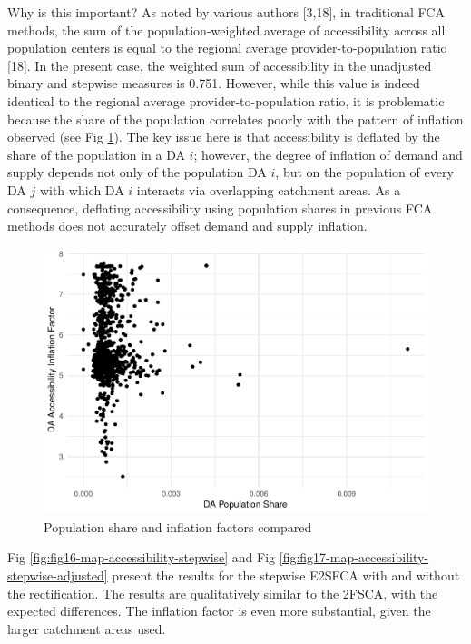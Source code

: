 \documentclass[10pt,letterpaper]{article}
\begin{document}
Why is this important? As noted by various authors {[}3,18{]}, in
traditional FCA methods, the sum of the population-weighted average of
accessibility across all population centers is equal to the regional
average provider-to-population ratio {[}18{]}. In the present case, the
weighted sum of accessibility in the unadjusted binary and stepwise
measures is 0.751. However, while this value is indeed identical to the
regional average provider-to-population ratio, it is problematic because
the share of the population correlates poorly with the pattern of
inflation observed (see Fig
\ref{fig:fig15-map-pop-share-inflation-comparison-binary}). The key
issue here is that accessibility is deflated by the share of the
population in a DA \(i\); however, the degree of inflation of demand and
supply depends not only of the population DA \(i\), but on the
population of every DA \(j\) with which DA \(i\) interacts via
overlapping catchment areas. As a consequence, deflating accessibility
using population shares in previous FCA methods does not accurately
offset demand and supply inflation.

\begin{figure}
\includegraphics[width=0.95\linewidth]{Supply_and_Demand_Inflation_in_FCA_Methods_v2.0_files/figure-latex/fig15-map-pop-share-inflation-comparison-binary-1} \caption{\label{fig:fig15-map-pop-share-inflation-comparison-binary}Population share and inflation factors compared}\label{fig:fig15-map-pop-share-inflation-comparison-binary}
\end{figure}

Fig \ref{fig:fig16-map-accessibility-stepwise} and Fig
\ref{fig:fig17-map-accessibility-stepwise-adjusted} present the results
for the stepwise E2SFCA with and without the rectification. The results
are qualitatively similar to the 2FSCA, with the expected differences.
The inflation factor is even more substantial, given the larger
catchment areas used.
\end{document}
